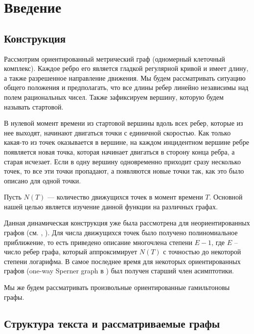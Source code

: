 \documentclass{article}
\begin{document}
\tableofcontents

\pagebreak

\section{Введение}

\subsection{Конструкция}

Рассмотрим ориентированный метрический граф (одномерный клеточный комплекс). Каждое ребро его является гладкой регулярной кривой и имеет длину, а также разрешенное направление движения. Мы будем рассматривать ситуацию общего положения и предполагать, что все длины ребер линейно независимы над полем рациональных чисел. Также зафиксируем вершину, которую будем называть стартовой.


В нулевой момент времени из стартовой вершины вдоль всех ребер, которые из нее выходят, начинают двигаться точки с единичной скоростью. Как только какая-то из точек оказывается в вершине, на каждом инцидентном вершине ребре появляется новая точка, которая начинает двигаться в сторону конца ребра, а старая исчезает. Если в одну вершину одновременно приходит сразу несколько точек, то все эти точки пропадают, а появляются новые точки так, как это было описано для одной точки.


Пусть $N(T)$ --- количество движущихся точек в момент времени $T$. Основной нашей целью является изучение данной функции на различных графах.

Данная динамическая конструкция уже была рассмотрена для неориентированных графов (см. \cite{poly}, \cite{second}). Для числа движущихся точек было получено полиномиальное приближение, то есть приведено описание многочлена степени $E - 1$, где $E$ – число ребер графа, который аппроксимирует $N(T)$ с точностью до некоторой степени логарифма. В самое последнее время для некоторых ориентированных графов (one-way Sperner graph в \cite{2021}) был получен старший член асимптотики.

Мы же будем рассматривать произвольные ориентированные гамильтоновы графы.



\subsection{Структура текста и рассматриваемые графы}
\end{document}
